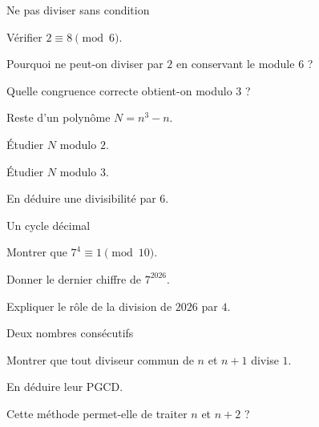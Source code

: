 \begingroup\renewcommand{\otBesoinPlace}[1]{}\begin{minipage}{\linewidth}
\begin{exercice}[3]{Ne pas diviser sans condition}

\begin{questions}
\item Vérifier $2\equiv8\pmod6$.
\item Pourquoi ne peut-on diviser par $2$ en conservant le module $6$ ?
\item Quelle congruence correcte obtient-on modulo $3$ ?
\end{questions}
\end{exercice}
\begin{exercice}[3]{Reste d’un polynôme}
$N=n^3-n$.
\begin{questions}
\item Étudier $N$ modulo $2$.
\item Étudier $N$ modulo $3$.
\item En déduire une divisibilité par $6$.
\end{questions}
\end{exercice}
\begin{exercice}[3]{Un cycle décimal}

\begin{questions}
\item Montrer que $7^4\equiv1\pmod{10}$.
\item Donner le dernier chiffre de $7^{2026}$.
\item Expliquer le rôle de la division de $2026$ par $4$.
\end{questions}
\end{exercice}
\begin{exercice}[3]{Deux nombres consécutifs}

\begin{questions}
\item Montrer que tout diviseur commun de $n$ et $n+1$ divise $1$.
\item En déduire leur PGCD.
\item Cette méthode permet-elle de traiter $n$ et $n+2$ ?
\end{questions}
\end{exercice}
\end{minipage}\endgroup
